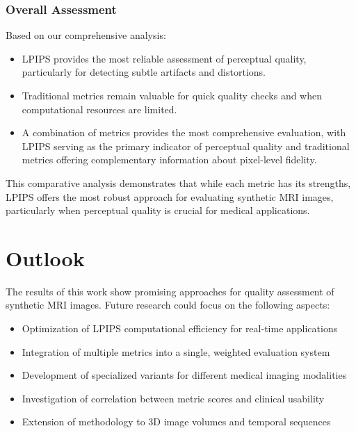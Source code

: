 \documentclass[a4paper,12pt]{article}
\begin{document}
\subsubsection{Overall Assessment}
Based on our comprehensive analysis:

\begin{itemize}
    \item LPIPS provides the most reliable assessment of perceptual quality, particularly for detecting subtle artifacts and distortions.
    
    \item Traditional metrics remain valuable for quick quality checks and when computational resources are limited.
    
    \item A combination of metrics provides the most comprehensive evaluation, with LPIPS serving as the primary indicator of perceptual quality and traditional metrics offering complementary information about pixel-level fidelity.
\end{itemize}

This comparative analysis demonstrates that while each metric has its strengths, LPIPS offers the most robust approach for evaluating synthetic MRI images, particularly when perceptual quality is crucial for medical applications.


\section{Outlook}
The results of this work show promising approaches for quality assessment of synthetic MRI images. Future research could focus on the following aspects:

\begin{itemize}
    \item Optimization of LPIPS computational efficiency for real-time applications
    \item Integration of multiple metrics into a single, weighted evaluation system
    \item Development of specialized variants for different medical imaging modalities
    \item Investigation of correlation between metric scores and clinical usability
    \item Extension of methodology to 3D image volumes and temporal sequences
\end{itemize}


\newpage

\newpage

\FloatBarrier

\printbibliography
\newpage

\listoffigures
\newpage

\listoftables
\newpage
\end{document}

